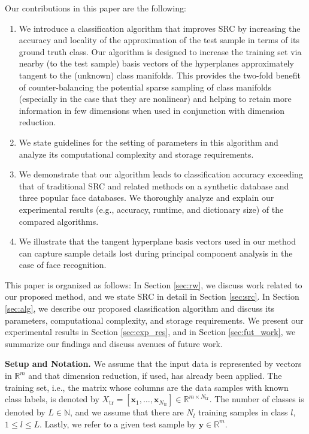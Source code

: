 \documentclass[review]{elsarticle}
\begin{document}
Our contributions in this paper are the following:
\begin{enumerate}
\item We introduce a classification algorithm that improves SRC by increasing the accuracy and locality of the approximation of the test sample in terms of its ground truth class. Our algorithm is designed to increase the training set via nearby (to the test sample) basis vectors of the hyperplanes approximately tangent to the (unknown) class manifolds. This provides the two-fold benefit of counter-balancing the potential sparse sampling of class manifolds (especially in the case that they are nonlinear) and helping to retain more information in few dimensions when used in conjunction with dimension reduction. 
\item We state guidelines for the setting of parameters in this algorithm and analyze its computational complexity and storage requirements. 
\item We demonstrate that our algorithm leads to classification accuracy exceeding that of traditional SRC and related methods on a synthetic database and three popular face databases. We thoroughly analyze and explain our experimental results (e.g., accuracy, runtime, and dictionary size) of the compared algorithms. 
\item We illustrate that the tangent hyperplane basis vectors used in our method can capture sample details lost during principal component analysis in the case of face recognition. 
\end{enumerate}

This paper is organized as follows: In Section \ref{sec:rw}, we discuss work related to our proposed method, and we state SRC in detail in Section \ref{sec:src}. In Section \ref{sec:alg}, we describe our proposed classification algorithm and discuss its parameters, computational complexity, and storage requirements. We present our experimental results in Section \ref{sec:exp_res}, and in Section \ref{sec:fut_work}, we summarize our findings and discuss avenues of future work. 

\textbf{Setup and Notation.} We assume that the input data is represented by vectors in $\mathbb{R}^m$ and that dimension reduction, if used, has already been applied. The training set, i.e., the matrix whose columns are the data samples with known class labels, is denoted by $X_\mathrm{tr} = [\bm{x}_1,\ldots,\bm{x}_{N_\mathrm{tr}}] \in \mathbb{R}^{m\times N_{\mathrm{tr}}}$. The number of classes is denoted by $L \in \mathbb{N}$, and we assume that there are $N_l$ training samples in class $l$, $1\leq l \leq L$. Lastly, we refer to a given test sample by $\bm{y} \in \mathbb{R}^m$. 
\end{document}
